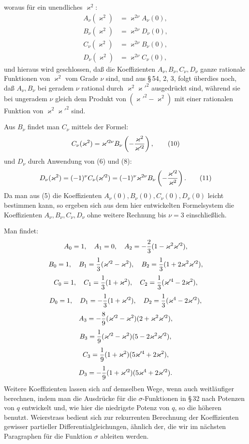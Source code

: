 \documentclass[11pt]{article}
\begin{document}
woraus für ein unendliches $\varkappa^2$:
\begin{equation}
\begin{aligned}
A_\nu(\varkappa^2)&=\varkappa^{2\nu}A_\nu(0),\\
B_\nu(\varkappa^2)&=\varkappa^{2\nu}D_\nu(0),\\
C_\nu(\varkappa^2)&=\varkappa^{2\nu}B_\nu(0),\\
D_\nu(\varkappa^2)&=\varkappa^{2\nu}C_\nu(0),
\end{aligned}
\tag{9}
\end{equation}
und hieraus wird geschlossen, daß die Koeffizienten $A_\nu,B_\nu,C_\nu,D_\nu$ ganze rationale Funktionen von $\varkappa^2$ vom Grade $\nu$ sind, und aus \S\,54, 2, 3, folgt überdies noch, daß $A_\nu,B_\nu$ bei geradem $\nu$ rational durch $\varkappa^2\varkappa'^2$ ausgedrückt sind, während sie bei ungeradem $\nu$ gleich dem Produkt von $(\varkappa'^2-\varkappa^2)$ mit einer rationalen Funktion von $\varkappa^2\varkappa'^2$ sind.

Aus $B_\nu$ findet man $C_\nu$ mittels der Formel:
\begin{equation}
C_\nu(\varkappa^2)=\varkappa'^{2\nu}B_\nu\left(-{\varkappa^2\over\varkappa'^2}\right),
\tag{10}
\end{equation}
und $D_\nu$ durch Anwendung von (6) und (8):
\begin{equation}
D_\nu(\varkappa^2)=(-1)^\nu C_\nu(\varkappa'^2)=(-1)^\nu\varkappa^{2\nu}B_\nu\left(-{\varkappa'^2\over\varkappa^2}\right).
\tag{11}
\end{equation}
Da man aus (5) die Koeffizienten $A_\nu(0),B_\nu(0),C_\nu(0),D_\nu(0)$ leicht bestimmen kann, so ergeben sich aus dem hier entwickelten Formelsystem die Koeffizienten $A_\nu,B_\nu,C_\nu,D_\nu$ ohne weitere Rechnung bis $\nu=3$ einschließlich.

Man findet:
\[
A_0=1,
\quad A_1=0,
\quad A_2=-{2\over3}(1-\varkappa^2\varkappa'^2),
\]
\[
B_0=1,
\quad B_1={1\over3}(\varkappa'^2-\varkappa^2),
\quad B_2={1\over3}(1+2\varkappa^2\varkappa'^2),
\]
\[
C_0=1,
\quad C_1={1\over3}(1+\varkappa^2),
\quad C_2={1\over3}(\varkappa'^4-2\varkappa^2),
\]
\[
D_0=1,
\quad D_1=-{1\over3}(1+\varkappa'^2),
\quad D_2={1\over3}(\varkappa^4-2\varkappa'^2),
\]
\[
A_3=-{8\over9}(\varkappa'^2-\varkappa^2)(2+\varkappa^2\varkappa'^2),
\]
\[
B_3={1\over9}(\varkappa'^2-\varkappa^2)(5-2\varkappa^2\varkappa'^2),
\]
\[
C_3={1\over9}(1+\varkappa^2)(5\varkappa'^4+2\varkappa^2),
\]
\[
D_3=-{1\over9}(1+\varkappa'^2)(5\varkappa^4+2\varkappa'^2).
\]
Weitere Koeffizienten lassen sich auf demselben Wege, wenn auch weitläufiger berechnen, indem man die Ausdrücke für die $\sigma$-Funktionen in \S\,32 nach Potenzen von $q$ entwickelt und, wie hier die niedrigste Potenz von $q$, so die höheren benutzt. Weierstrass bedient sich zur rekurrenten Berechnung der Koeffizienten gewisser partieller Differentialgleichungen, ähnlich der, die wir im nächsten Paragraphen für die Funktion $\sigma$ ableiten werden.
\end{document}

